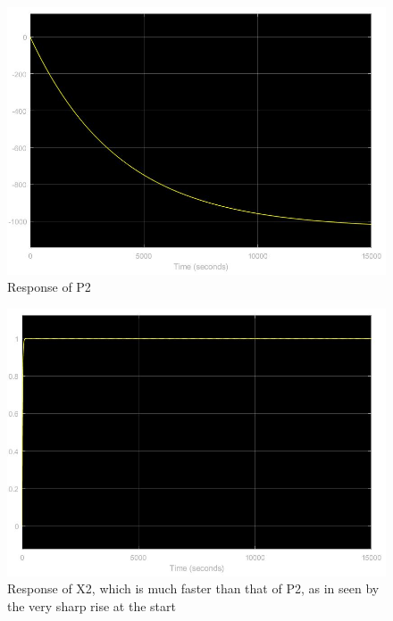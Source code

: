 \documentclass[11pt]{article}
\begin{document}
\begin{figure}[H]
\centering	\includegraphics[scale = 0.4]
{P2_15000}
\caption{Response of P2}
\label{P2}
\end{figure}

\begin{figure}[H]
\centering	\includegraphics[scale = 0.4]
{X2_15000}
\caption{Response of X2, which is much faster than that of P2, as in seen by the very sharp rise at the start}
\label{X2}
\end{figure}
\end{document}

